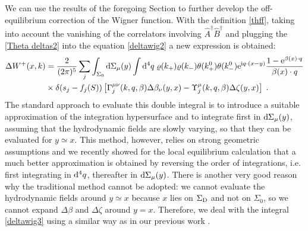 \documentclass[prd,superscriptaddress,nofootinbib,notitlepage]{revtex4-1}
\def\wAd{\widehat A^{\dagger}}
\def\wBd{\widehat B^{\dagger}}
\newcommand{\e}{{\rm e}}
\newcommand{\di}{{\rm d}}
\newcommand{\ii}{{\rm i}}
\begin{document}
We can use the results of the foregoing Section to further develop the off-equilibrium correction of the Wigner
function. With the definition \eqref{thff}, taking into account the vanishing of the correlators involving 
$\wAd\wBd$ and plugging the \eqref{Theta deltas2} into the equation \eqref{deltawig2} a new expression is obtained:
%
\begin{align}\label{deltawig3}
\Delta W^+(x,k) &=\frac{2}{(2\pi)^5} \sum_{j} \int_{\Sigma_{0}} \di \Sigma_{\mu}(y) 
\int \di^{4}q\;  
\varrho(k_+)\varrho(k_-)\theta(k_+^0)\theta(k_-^0) \e^{\ii q\cdot (x-y)} \frac{1 -\e^{\beta(x)\cdot q}}{\beta(x) \cdot q} \nonumber\\
&\times
 \delta(s_j - f_j(S)) \left[ \Gamma_{j}^{\mu\nu}(k,q,\beta)\Delta\beta_\nu(y,x)-\Upsilon_{j}^\mu(k,q,\beta)\Delta\zeta(y,x) \right]\;.
\end{align}
%
The standard approach to evaluate this double integral is to introduce a suitable approximation of the integration 
hypersurface \cite{Fu:2021pok,Liu:2021uhn,Becattini:2021suc,Sheng:2024pbw,Zhang:2024mhs} and to integrate first 
in $\di \Sigma_\mu(y)$, assuming that the hydrodynamic fields are slowly varying, so that they can be evaluated
for $y \simeq x$. This method, however, relies on strong geometric assumptions and we recently showed for the local
equilibrium calculation \cite{Sheng:2025cjk} that a much better approximation is obtained by reversing the order of 
integrations, i.e. first integrating in $\di^4 q$, thereafter in $\di \Sigma_\mu(y)$. There is another very good reason 
why the traditional method cannot be adopted: we cannot evaluate the hydrodynamic fields around $y \simeq x$ because $x$ 
lies on $\Sigma_{\rm D}$ and not on $\Sigma_0$, so we cannot expand $\Delta\beta$ and $\Delta\zeta$ around $y=x$. 
Therefore, we deal with the integral \eqref{deltawig3} using a similar way as in our previous work \cite{Sheng:2025cjk}.
\end{document}
